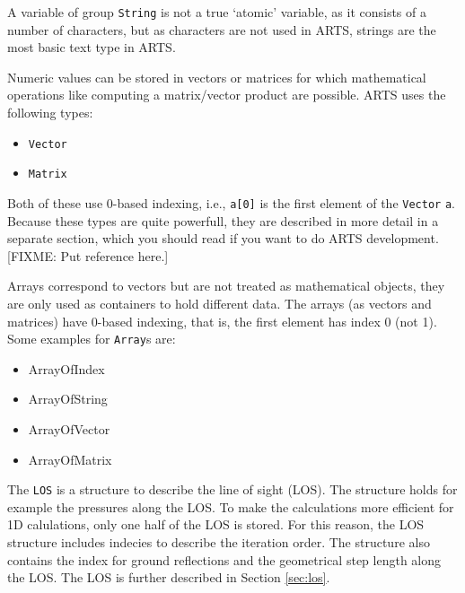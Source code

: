 A variable of group \verb|String| is not a true `atomic' variable, as
it consists of a number of characters, but as characters are not used
in ARTS, strings are the most basic text type in ARTS.
  

\label{sec:formats:nummath}
 
Numeric values can be stored in vectors or matrices for which
mathematical operations like computing a matrix/vector product are
possible. ARTS uses the following types:

\begin{itemize}
\item \verb|Vector|
\item \verb|Matrix|
\end{itemize}

Both of these use 0-based indexing, i.e., \verb|a[0]| is the first
element of the \verb|Vector| \verb|a|.  Because these types are quite
powerfull, they are described in more detail in a separate section,
which you should read if you want to do ARTS development. [FIXME: Put
reference here.]

 \label{sec:formats:atomic_arrays}
 
Arrays correspond to vectors but are not treated as mathematical
objects, they are only used as containers to hold different data.
The arrays (as vectors and matrices) have 0-based indexing, that is,
the first element has index 0 (not 1). Some examples for \verb|Array|s
are:

\begin{itemize}
\item ArrayOfIndex
\item ArrayOfString
\item ArrayOfVector
\item ArrayOfMatrix
\end{itemize}


The \verb|LOS| is a structure to describe the line of sight (LOS).
The structure holds for example the pressures along the LOS. To make the
calculations more efficient for 1D calulations, only one half of the
LOS is stored.  For this reason, the LOS structure includes indecies
to describe the iteration order. The structure also contains the
index for ground reflections and the geometrical step length along
the LOS. The LOS is further described in Section \ref{sec:los}.




